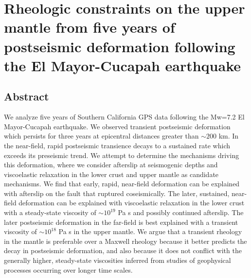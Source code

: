 \chapter{Rheologic constraints on the upper mantle from five years of
postseismic deformation following the El Mayor-Cucapah earthquake}

\section{Abstract}
We analyze five years of Southern California GPS data following the
Mw=7.2 El Mayor-Cucapah earthquake.  We observed transient postseismic
deformation which persists for three years at epicentral distances
greater than ${\sim}200$ km.  In the near-field, rapid postseismic
transience decays to a sustained rate which exceeds its preseismic
trend.  We attempt to determine the mechanisms driving this
deformation, where we consider afterslip at seismogenic depths and
viscoelastic relaxation in the lower crust and upper mantle as
candidate mechanisms.  We find that early, rapid, near-field
deformation can be explained with afterslip on the fault that ruptured
coseismically. The later, sustained, near-field deformation can be
explained with viscoelastic relaxation in the lower crust with a
steady-state viscosity of ${\sim}10^{19}$ Pa s and possibly continued
afterslip.  The later postseismic deformation in the far-field is best
explained with a transient viscosity of ${\sim}10^{18}$ Pa s in the
upper mantle. We argue that a transient rheology in the mantle is
preferable over a Maxwell rheology because it better predicts the
decay in postseismic deformation, and also because it does not
conflict with the generally higher, steady-state viscosities inferred
from studies of geophysical processes occurring over longer time
scales.

